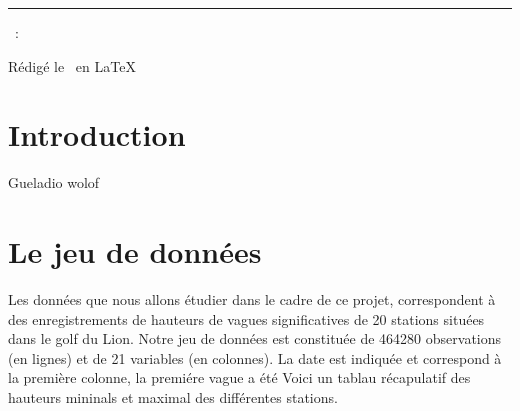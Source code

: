 \documentclass[a4paper,french,10pt]{article}
\begin{document}
	
	\title{\vspace{-1in}} %
	\author{} %
	\date{} %
	\maketitle %
	
	\usebox{\myReportTitle}
	\vspace{1in} %
	
	{\centering \huge \assignmentName \par}
	{\centering \noindent\rule{4in}{0.1pt} \par}
	\vspace{0.05in}
	{\centering \courseCode~: \courseName~ \par}
	{\centering Rédigé le \pubDate\ en \LaTeX \par}
	\vspace{1in}
	
	\tableofcontents
	\newpage
	
	
\section{Introduction}
Gueladio wolof	

\section{Le jeu de données}
Les données que nous allons étudier dans le cadre de ce projet, correspondent à des enregistrements de hauteurs de vagues significatives de 20 stations situées dans le golf du Lion. Notre jeu de données est constituée de 464280 observations (en lignes) et de 21 variables (en colonnes). La date est indiquée et correspond à la première colonne, la premiére vague a été Voici un tablau récapulatif des hauteurs mininals et maximal des différentes stations.

%


\end{document}
